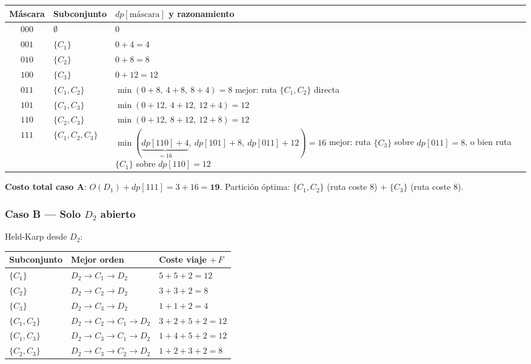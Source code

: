 \documentclass[12pt,a4paper]{article}
\begin{document}
\begin{center}
\begin{tabular}{clp{7.5cm}}
\toprule
Máscara & Subconjunto & $dp[\text{máscara}]$ y razonamiento \\
\midrule
$000$ & $\emptyset$              & 0 \\
$001$ & $\{C_1\}$               & $0+4=4$ \\
$010$ & $\{C_2\}$               & $0+8=8$ \\
$100$ & $\{C_3\}$               & $0+12=12$ \\
$011$ & $\{C_1,C_2\}$           & $\min(0+8,\ 4+8,\ 8+4)=8$
                                  \newline mejor: ruta $\{C_1,C_2\}$ directa \\
$101$ & $\{C_1,C_3\}$           & $\min(0+12,\ 4+12,\ 12+4)=12$ \\
$110$ & $\{C_2,C_3\}$           & $\min(0+12,\ 8+12,\ 12+8)=12$ \\
$111$ & $\{C_1,C_2,C_3\}$       & $\min(\underbrace{dp[110]+4}_{=16},\ dp[101]+8,\ dp[011]+12)=16$
                                  \newline mejor: ruta $\{C_3\}$ sobre $dp[011]=8$, o bien ruta $\{C_1\}$ sobre $dp[110]=12$ \\
\bottomrule
\end{tabular}
\end{center}

\textbf{Costo total caso A}: $O(D_1) + dp[111] = 3 + 16 = \mathbf{19}$.
Partición óptima: $\{C_1,C_2\}$ (ruta coste 8) $+$ $\{C_3\}$ (ruta coste 8).

\subsubsection*{Caso B — Solo $D_2$ abierto}

Held-Karp desde $D_2$:

\begin{center}
\begin{tabular}{lll}
\toprule
Subconjunto & Mejor orden & Coste viaje $+\,F$ \\
\midrule
$\{C_1\}$     & $D_2\!\to\!C_1\!\to\!D_2$              & $5+5+2=12$ \\
$\{C_2\}$     & $D_2\!\to\!C_2\!\to\!D_2$              & $3+3+2=8$  \\
$\{C_3\}$     & $D_2\!\to\!C_3\!\to\!D_2$              & $1+1+2=4$  \\
$\{C_1,C_2\}$ & $D_2\!\to\!C_2\!\to\!C_1\!\to\!D_2$   & $3+2+5+2=12$ \\
$\{C_1,C_3\}$ & $D_2\!\to\!C_3\!\to\!C_1\!\to\!D_2$   & $1+4+5+2=12$ \\
$\{C_2,C_3\}$ & $D_2\!\to\!C_3\!\to\!C_2\!\to\!D_2$   & $1+2+3+2=8$  \\
\bottomrule
\end{tabular}
\end{center}
\end{document}
